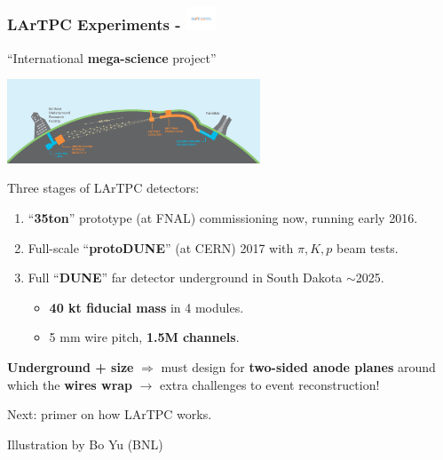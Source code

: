 \documentclass[xcolor=dvipsnames]{beamer}
\begin{document}
\begin{frame}[fragile]
  \frametitle{LArTPC Experiments - \includegraphics[height=7mm,trim=4cm 9.2cm 4cm 9.3cm,clip,valign=c]{DUNElogo_colorHORIZONTAL.pdf}}
  \begin{center}
    ``International \textbf{mega-science} project''

    \includegraphics[height=25mm]{LBNF_Graphic_021715-1024x340.png}
  \end{center}


  Three stages of LArTPC detectors:
  \begin{enumerate}\footnotesize
  \item ``\textbf{35ton}'' prototype (at FNAL) commissioning now, running early 2016.
  \item Full-scale ``\textbf{protoDUNE}'' (at CERN) 2017 with $\pi, K, p$ beam tests.
  \item Full ``\textbf{DUNE}'' far detector underground in South Dakota $\sim$2025.
    \begin{itemize}
    \item \textbf{40 kt fiducial mass} in 4 modules.
    \item 5 mm wire pitch, \textbf{1.5M channels}.
    \end{itemize}
  \end{enumerate}

  \footnotesize \textbf{Underground + size} $\Rightarrow$ must design
  for \textbf{two-sided anode planes} around which the \textbf{wires
    wrap} $\rightarrow$ extra challenges to event reconstruction!

\end{frame}

\begin{frame}

  \vfill

  \begin{center}
    Next: primer on how LArTPC works.
  \end{center}

  \vfill

  \flushright \scriptsize Illustration by Bo Yu (BNL)
\end{frame}
\end{document}
